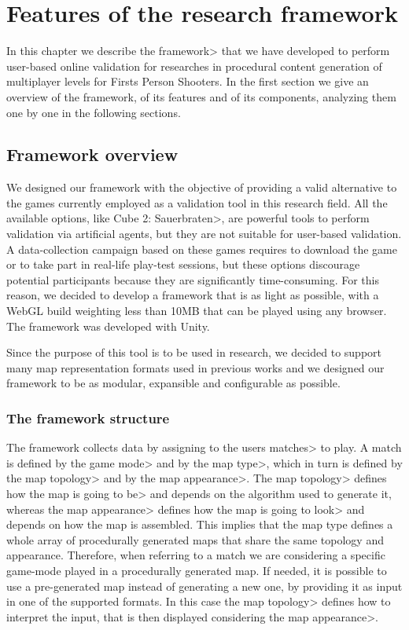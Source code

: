 \chapter{Features of the research framework}


In this chapter we describe the \<framework> that we have developed to perform user-based online validation for researches in procedural content generation of multiplayer levels for Firsts Person Shooters. In the first section we give an overview of the framework, of its features and of its components, analyzing them one by one in the following sections.


\section{Framework overview}

We designed our framework with the objective of providing a valid alternative to the games currently employed as a validation tool in this research field. All the available options, like \<Cube 2: Sauerbraten>, are powerful tools to perform validation via artificial agents, but they are not suitable for user-based validation. A data-collection campaign based on these games requires to download the game or to take part in real-life play-test sessions, but these options discourage potential participants because they are significantly time-consuming. For this reason, we decided to develop a framework that is as light as possible, with a WebGL build weighting less than 10MB that can be played using any browser. The framework was developed with Unity.

\par

Since the purpose of this tool is to be used in research, we decided to support many map representation formats used in previous works and we designed our framework to be as modular, expansible and configurable as possible.

\subsection{The framework structure}

The framework collects data by assigning to the users \<matches> to play. A match is defined by the \<game mode> and by the \<map type>, which in turn is defined by the \<map topology> and by the \<map appearance>. The \<map topology> defines how the map is going to \<be> and depends on the algorithm used to generate it, whereas the \<map appearance> defines how the map is going to \<look> and depends on how the map is assembled. This implies that the map type defines a whole array of procedurally generated maps that share the same topology and appearance. Therefore, when referring to a match we are considering a specific game-mode played in a procedurally generated map. If needed, it is possible to use a pre-generated map instead of generating a new one, by providing it as input in one of the supported formats. In this case the \<map topology> defines how to interpret the input, that is then displayed considering the \<map appearance>.

